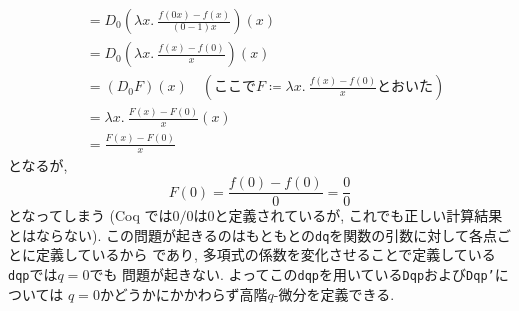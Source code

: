 \documentclass[11pt]{jsreport}
\theoremstyle{mystyle}
\newtheorem{rmk}[df]{$\textrm{Remark}$}
\newcommand{\brmk}{\begin{rmk}}
\newcommand{\ermk}{\end{rmk}}
\newcommand{\0}{\textbf{0}}
\newcommand{\1}{\textbf{1}}
\newcommand{\2}{\textbf{2}}
\begin{document}
\begin{enumerate}
\begin{align*}
	                    &= D_0 \left( \lambda x.\ \frac{f (0 x) - f(x)}{(0 - 1)x} \right) (x) \\
	                    &= D_0 \left( \lambda x.\ \frac{f(x) - f(0)}{x} \right) (x) \\
	                    &= (D_0 F) (x)
	                      \quad (\text{ここで}F \coloneqq \lambda x.\ \frac{f(x) - f(0)}{x}
	                                \text{とおいた})\\
	                    &= \lambda x.\ \frac{F(x) - F(0)}{x} (x) \\
	                    &= \frac{F(x) - F(0)}{x}
	\end{align*}
	となるが, 
	\[
	  F(0) = \frac{f(0) - f(0)}{0} = \frac{0}{0}
	\]
	となってしまう
	(Coq では$0/0$は$0$と定義されているが, これでも正しい計算結果とはならない).
	この問題が起きるのはもともとの{\tt dq}を関数の引数に対して各点ごとに定義しているから
	であり, 多項式の係数を変化させることで定義している{\tt dqp}では$q = 0$でも
	問題が起きない. よってこの{\tt dqp}を用いている{\tt Dqp}および{\tt Dqp'}については
	$q = 0$かどうかにかかわらず高階$q$-微分を定義できる. 
\end{enumerate}
\end{document}
